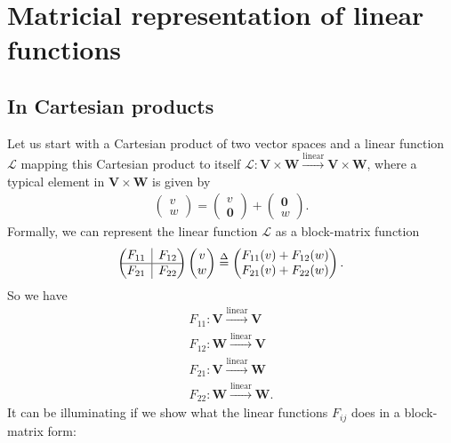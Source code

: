 \documentclass{book}
\theoremstyle{definition}
\newcommand{\V}{\mathbf{V}}
\newcommand{\W}{\mathbf{W}}
\newcommand{\lag}{\mathcal{L}}
\newcommand{\lin}{\overset{\text{linear}}{\longrightarrow}}
\newcommand{\rvline}{\hspace*{-\arraycolsep}\vline\hspace*{-\arraycolsep}}
\begin{document}
\section{Matricial representation of linear functions}

\subsection{In Cartesian products}

Let us start with a Cartesian product of two vector spaces and a linear function $\lag$ mapping this Cartesian product to itself $\lag : \V \times \W \lin \V \times \W$, where a typical element in $\V\times \W$ is given by
\begin{align*}
\begin{pmatrix}
v\\w
\end{pmatrix} = \begin{pmatrix}
v\\ \mathbf{0}
\end{pmatrix} + \begin{pmatrix}
\mathbf{0} \\ w
\end{pmatrix}.
\end{align*}
Formally, we can represent the linear function $\lag$ as a block-matrix function
\begin{align*}
\begin{pmatrix}
\begin{matrix}
F_{11}
\end{matrix}
& \rvline & F_{12} \\
\hline
F_{21} & \rvline &
F_{22}
\end{pmatrix}\begin{pmatrix}
v\\w
\end{pmatrix} \stackrel{\Delta}{=} \begin{pmatrix}
F_{11}(v) + F_{12}(w)\\
F_{21}(v) + F_{22}(w)
\end{pmatrix}.
\end{align*}
So we have 
\begin{align*}
F_{11} : \V \lin \V\\
F_{12} : \W \lin \V\\
F_{21} : \V \lin \W\\
F_{22} : \W \lin \W.
\end{align*}
It can be illuminating if we show what the linear functions $F_{ij}$ does in a block-matrix form:
\end{document}
